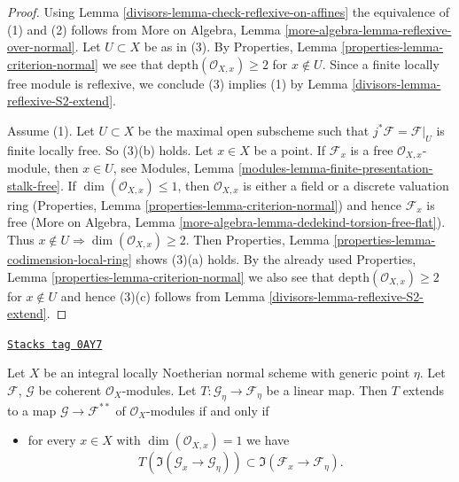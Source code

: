 \begin{proof}

Using Lemma \ref{divisors-lemma-check-reflexive-on-affines}
the equivalence of (1) and (2) follows from
More on Algebra, Lemma \ref{more-algebra-lemma-reflexive-over-normal}.
Let $U \subset X$ be as in (3). By
Properties, Lemma \ref{properties-lemma-criterion-normal}
we see that $\text{depth}(\mathcal{O}_{X, x}) \geq 2$
for $x \not \in U$. Since a finite locally free module is reflexive,
we conclude (3) implies (1) by Lemma \ref{divisors-lemma-reflexive-S2-extend}.

\medskip\noindent
Assume (1). Let $U \subset X$ be the maximal open subscheme such
that $j^*\mathcal{F} = \mathcal{F}|_U$
is finite locally free. So (3)(b) holds. Let $x \in X$ be a point.
If $\mathcal{F}_x$ is a free $\mathcal{O}_{X, x}$-module, then
$x \in U$, see
Modules, Lemma \ref{modules-lemma-finite-presentation-stalk-free}.
If $\dim(\mathcal{O}_{X, x}) \leq 1$, then $\mathcal{O}_{X, x}$
is either a field or a discrete valuation ring
(Properties, Lemma \ref{properties-lemma-criterion-normal})
and hence $\mathcal{F}_x$ is free (More on Algebra, Lemma
\ref{more-algebra-lemma-dedekind-torsion-free-flat}).
Thus $x \not \in U \Rightarrow \dim(\mathcal{O}_{X, x}) \geq 2$.
Then Properties, Lemma \ref{properties-lemma-codimension-local-ring}
shows (3)(a) holds. By the already used
Properties, Lemma \ref{properties-lemma-criterion-normal}
we also see that $\text{depth}(\mathcal{O}_{X, x}) \geq 2$
for $x \not \in U$ and hence (3)(c) follows from
Lemma \ref{divisors-lemma-reflexive-S2-extend}.
\end{proof}

\begin{lemma}
\label{divisors-lemma-describe-reflexive-hull}
\href{https://stacks.math.columbia.edu/tag/0AY7}{\texttt{Stacks tag 0AY7}}

Let $X$ be an integral locally Noetherian normal scheme with
generic point $\eta$. Let $\mathcal{F}$, $\mathcal{G}$ be coherent
$\mathcal{O}_X$-modules. Let $T : \mathcal{G}_\eta \to \mathcal{F}_\eta$
be a linear map. Then $T$ extends to a map
$\mathcal{G} \to \mathcal{F}^{**}$ of $\mathcal{O}_X$-modules
if and only if
\begin{itemize}
\item[(*)] for every $x \in X$ with $\dim(\mathcal{O}_{X, x}) = 1$
we have
$$
T\left(\Im(\mathcal{G}_x \to \mathcal{G}_\eta)\right) \subset
\Im(\mathcal{F}_x \to \mathcal{F}_\eta).
$$
\end{itemize}
\end{lemma}

